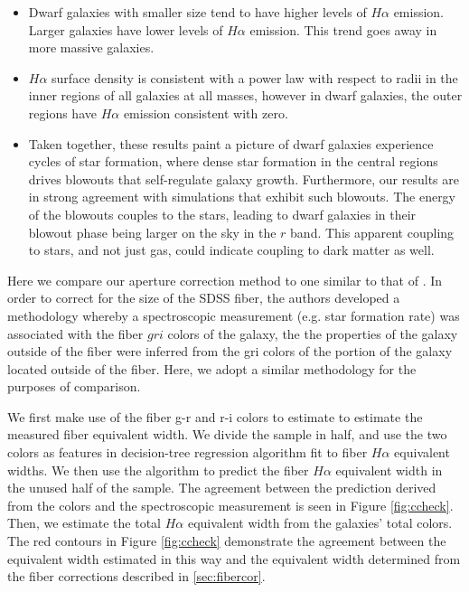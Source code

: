 \documentclass[iop]{emulateapj}
\begin{document}
\begin{itemize}
\item Dwarf galaxies with smaller size tend to have higher levels of $H\alpha$ emission. Larger galaxies have lower levels of $H\alpha$ emission. This trend goes away in more massive galaxies. 

\item $H\alpha$ surface density is consistent with a power law with respect to radii in the inner regions of all galaxies at all masses, however in dwarf galaxies, the outer regions have $H\alpha$ emission consistent with zero.

\item Taken together, these results paint a picture of dwarf galaxies experience cycles of star formation, where dense star formation in the central regions drives blowouts that self-regulate galaxy growth. Furthermore, our results are in strong agreement with simulations that exhibit such blowouts. The energy of the blowouts couples to the stars, leading to dwarf galaxies in their blowout phase being larger on the sky in the $r$ band. This apparent coupling to stars, and not just gas, could indicate coupling to dark matter as well.

\end{itemize}





Here we compare our aperture correction method to one similar to that of \cite{Brinchmann04}. In order to correct for the size of the SDSS fiber, the authors developed a methodology whereby a spectroscopic measurement (e.g. star formation rate) was associated with the fiber $gri$ colors of the galaxy, the the properties of the galaxy outside of the fiber were inferred from the gri colors of the portion of the galaxy located outside of the fiber. Here, we adopt a similar methodology for the purposes of comparison. 




We first make use of the fiber g-r and r-i colors to estimate to estimate the measured fiber equivalent width. We divide the sample in half, and use the two colors as features in decision-tree regression algorithm fit to fiber $H\alpha$ equivalent widths. We then use the algorithm to predict the fiber $H\alpha$ equivalent width in the unused half of the sample. The agreement between the prediction derived from the colors and the spectroscopic measurement is seen in Figure \ref{fig:ccheck}. Then, we estimate the total $H\alpha$ equivalent width from the galaxies' total colors. The red contours in Figure \ref{fig:ccheck} demonstrate the agreement between the equivalent width estimated in this way and the equivalent width determined from the fiber corrections described in \ref{sec:fibercor}.
\end{document}
